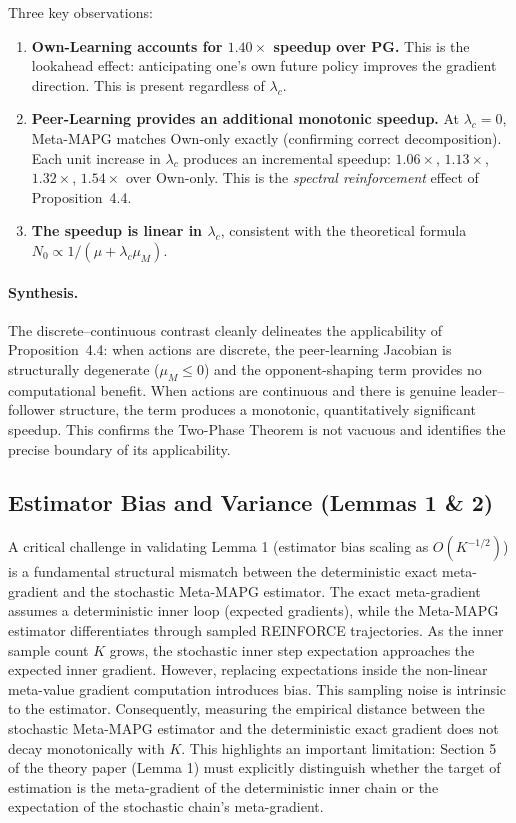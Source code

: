 \documentclass[11pt,a4paper]{article}
\theoremstyle{remark}
\begin{document}
\noindent Three key observations:
\begin{enumerate}[itemsep=2pt]
  \item \textbf{Own-Learning accounts for $1.40\times$ speedup over PG.} This is the lookahead effect: anticipating one's own future policy improves the gradient direction. This is present regardless of $\lambda_c$.
  \item \textbf{Peer-Learning provides an additional monotonic speedup.} At $\lambda_c{=}0$, Meta-MAPG matches Own-only exactly (confirming correct decomposition). Each unit increase in $\lambda_c$ produces an incremental speedup: $1.06\times$, $1.13\times$, $1.32\times$, $1.54\times$ over Own-only. This is the \emph{spectral reinforcement} effect of Proposition~4.4.
  \item \textbf{The speedup is linear in $\lambda_c$}, consistent with the theoretical formula $N_0 \propto 1/(\mu + \lambda_c \mu_M)$.
\end{enumerate}

\paragraph{Synthesis.} The discrete--continuous contrast cleanly delineates the applicability of Proposition~4.4: when actions are discrete, the peer-learning Jacobian is structurally degenerate ($\mu_M \le 0$) and the opponent-shaping term provides no computational benefit. When actions are continuous and there is genuine leader--follower structure, the term produces a monotonic, quantitatively significant speedup. This confirms the Two-Phase Theorem is not vacuous and identifies the precise boundary of its applicability.

\subsection{Estimator Bias and Variance (Lemmas 1 \& 2)}
\label{sec:bias_variance}

A critical challenge in validating Lemma 1 (estimator bias scaling as $O(K^{-1/2})$) is a fundamental structural mismatch between the deterministic exact meta-gradient and the stochastic Meta-MAPG estimator. The exact meta-gradient assumes a deterministic inner loop (expected gradients), while the Meta-MAPG estimator differentiates through sampled REINFORCE trajectories. As the inner sample count $K$ grows, the stochastic inner step expectation approaches the expected inner gradient. However, replacing expectations inside the non-linear meta-value gradient computation introduces bias. This sampling noise is intrinsic to the estimator. Consequently, measuring the empirical distance between the stochastic Meta-MAPG estimator and the deterministic exact gradient does not decay monotonically with $K$. This highlights an important limitation: Section 5 of the theory paper (Lemma 1) must explicitly distinguish whether the target of estimation is the meta-gradient of the deterministic inner chain or the expectation of the stochastic chain's meta-gradient.
\end{document}
